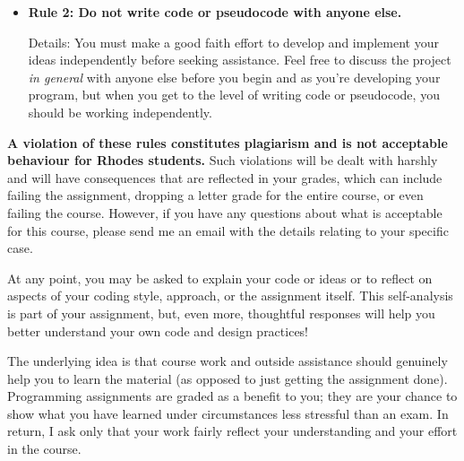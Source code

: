 \documentclass [letterpaper,11pt]{article}
\begin{document}
\begin{description}
\begin{itemize}
\begin{itemize}
                \item \textbf{Rule 2: Do not write code or pseudocode with anyone else.}
                
                Details: You must make a good faith effort to develop and implement your ideas
                independently before seeking assistance.  Feel free to discuss the project \emph{in general} with anyone else
                before you begin and as you're developing your program, but when you get to the level of writing code or
                pseudocode, you should be working independently.
                
                        \end{itemize}
        \end{itemize}

\textbf{A violation of these rules constitutes plagiarism and is not acceptable behaviour for Rhodes
students.} Such violations will be dealt with harshly and will have consequences that are
reflected in your grades, which can include failing the assignment, dropping a letter grade for
the entire course, or even failing the course. However, if you have any questions about what
is acceptable for this course, please send me an email with the details relating to your specific
case.

At any point, you may be asked to explain your code or ideas or to reflect on aspects of your
coding style, approach, or the assignment itself. This self-analysis is part of your assignment,
but, even more, thoughtful responses will help you better understand your own code and
design practices!

The underlying idea is that course work and outside assistance should genuinely help you to
learn the material (as opposed to just getting the assignment done). Programming assignments
are graded as a benefit to you; they are your chance to show what you have learned
under circumstances less stressful than an exam. In return, I ask only that your work fairly
reflect your understanding and your effort in the course.


\end{description}
\end{document}
